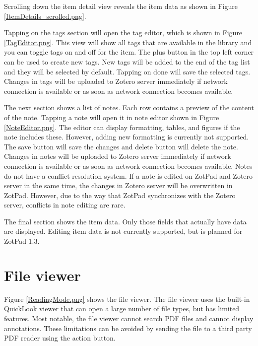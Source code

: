 \documentclass[oneside, openany, 12pt]{tufte-book}
\newcommand{\image}[2]{
	\center
	\fbox{\texttt{[image: images/iPhone/\{\#2]}}}

	\refstepcounter{figure}
	\smallskip\noindent\small Figure \thefigure: #1
	\label{#2}
	}
\newcommand{\image}[2]{
	\caption{#1}
	\label{#2}
	\fbox{\texttt{[image: images/iPad/\{\#2]}}}
	}
\begin{document}
Scrolling down the item detail view reveals the item data as shown in Figure \ref{ItemDetails_scrolled.png}. 

\begin{figure}
\image{Editing tags}{TagEditor.png}
\end{figure}

Tapping on the tags section will open the tag editor, which is shown in Figure \ref{TagEditor.png}. This view will show all tags that are available in the library and you can toggle tags on and off for the item. The plus button in the top left corner can be used to create new tags. New tags will be added to the end of the tag list and they will be selected by default. Tapping on done will save the selected tags. Changes in tags will be uploaded to Zotero server immediately if network connection is available or as soon as network connection becomes available.

The next section shows a list of notes. Each row contains a preview of the content of the note. Tapping a note will open it in note editor shown in Figure \ref{NoteEditor.png}. The editor can display formatting, tables, and figures if the note includes these. However, adding new formatting is currently not supported. The save button will save the changes and delete button will delete the note. Changes in notes will be uploaded to Zotero server immediately if network connection is available or as soon as network connection becomes available. Notes do not have a conflict resolution system. If a note is edited on ZotPad and Zotero server in the same time, the changes in Zotero server will be overwritten in ZotPad. However, due to the way that ZotPad synchronizes with the Zotero server, conflicts
in note editing are rare.

\begin{figure}
\image{Editing a note}{NoteEditor.png}
\end{figure}

The final section shows the item data. Only those fields that actually have data are displayed. Editing item data is not currently supported, but is planned for ZotPad 1.3.

\FloatBarrier

\section{File viewer}

Figure \ref{ReadingMode.png} shows the file viewer. The file viewer uses the built-in QuickLook viewer that can open a large number of file types, but has limited features. Most notable, the file viewer cannot search PDF files and cannot display annotations.  These limitations can be avoided by sending the file to a third party PDF reader using the action button.
\end{document}
